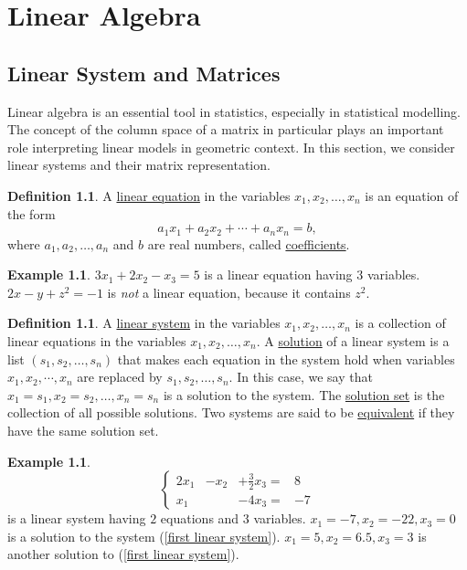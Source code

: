 \documentclass[12pt,letterpaper]{book}
\numberwithin{equation}{section}
\theoremstyle{definition}
\newtheorem{defi}[thm]{\textbf{Definition}}
\newtheorem{example}[thm]{\textbf{Example}}
\begin{document}
\chapter{Linear Algebra}

\section{Linear System and Matrices}\label{linear system}

Linear algebra is an essential tool in statistics, especially in statistical modelling. The concept of the column space of a matrix in particular plays an important role interpreting linear models in geometric context. In this section, we consider linear systems and their matrix representation.

\begin{defi} A \underline{linear equation} in the variables
$x_1,x_2,\ldots,x_n$ is an equation of the form
$$a_1x_1+a_2x_2+\cdots+a_nx_n=b,$$
where $a_1,a_2,\ldots,a_n$ and $b$ are real numbers, called
\underline{coefficients}.
\end{defi}

\begin{example} $3x_1+2x_2-x_3=5$ is a linear equation having $3$ variables. $2x-y+z^2=-1$ is \textit{not} a linear equation,
because it contains $z^2$.
\end{example}

\begin{defi} A \underline{linear system} in the variables
$x_1,x_2,\ldots,x_n$ is a collection of linear equations in the variables $x_1,x_2,\ldots,x_n$. A \underline{solution} of a linear system is a
list $(s_1,s_2,\ldots,s_n)$ that makes each equation in the system
hold when variables $x_1,x_2,\cdots, x_n$ are replaced by
$s_1,s_2,\ldots,s_n$. In this case, we say that $x_1=s_1,
x_2=s_2,\ldots, x_n=s_n$ is a solution to the system. The \underline{solution set} is the collection of all possible solutions. Two systems are said to be \underline{equivalent} if they have the
same solution set.
\end{defi}

\begin{example} \begin{equation}\label{first linear system}\left\{\begin{array}{rrrr}
2x_1&-x_2&+\frac{3}{2}x_3=&8
\\ x_1 & &- 4x_3=&-7 \end{array}\right.\end{equation}
is a linear system having $2$ equations and $3$ variables. $x_1=-7, x_2=-22, x_3=0$ is a solution to the system
(\ref{first linear system}). $x_1=5, x_2=6.5, x_3=3$ is another solution to (\ref{first linear system}).
\end{example}
\end{document}
